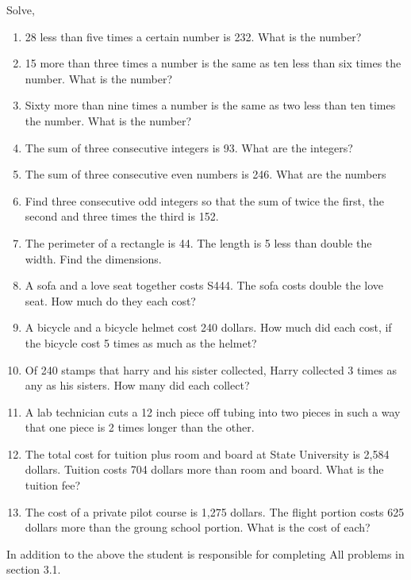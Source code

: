 \documentclass[12pt]{article}
\newenvironment{problem}[2][Problem]{\begin{trivlist}
\item[\hskip \labelsep {\bfseries #1}\hskip \labelsep {\bfseries #2.}]}{\end{trivlist}}
\begin{document}
\begin{problem}{2}
  Solve,
  \begin{enumerate}[label=\roman*)]
  \item 28 less than five times a certain number is 232.  What is the number?
  \item 15 more than three times a number is the same as ten less than six times the number.  What is the number?
    \item Sixty more than nine times a number is the same as two less than ten times the number. What is the number?
  \item The sum of three consecutive integers is 93.  What are the integers?
  \item The sum of three consecutive even numbers is 246.  What are the numbers
  \item Find three consecutive odd integers so that the sum of twice the first, the second and three times the third is 152.
  \item The perimeter of a rectangle is 44.  The length is 5 less than double the width.  Find the dimensions.
  \item A sofa and a love seat together costs S444. The sofa costs double the love seat. How much do they each cost?
  \item A bicycle and a bicycle helmet cost 240 dollars. How much did each cost, if the bicycle cost 5 times as much as the helmet?
  \item Of 240 stamps that harry and his sister collected, Harry collected 3 times as any as his sisters. How many did each collect?
  \item A lab technician cuts a 12 inch piece off tubing into two pieces in such a way that one piece is 2 times longer than the other.
  \item The total cost for tuition plus room and board at State University is 2,584 dollars. Tuition costs 704 dollars more than room and board. What is the tuition fee?
  \item The cost of a private pilot course is 1,275 dollars. The flight portion costs 625 dollars more than the groung school portion. What is the cost of each?
  \end{enumerate}

\end{problem}


\noindent In addition to the above the student is responsible for completing All problems in section 3.1.
\end{document}
